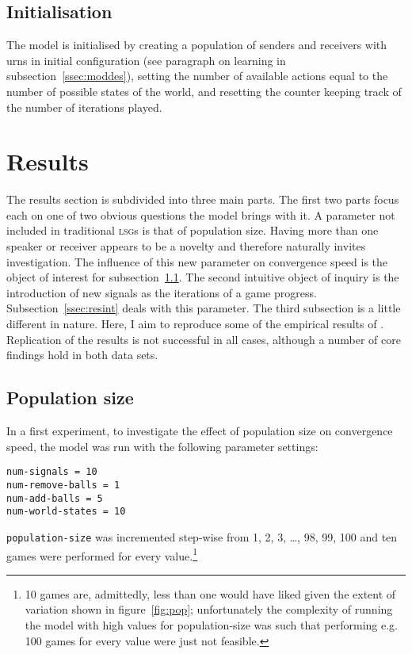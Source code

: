 \documentclass[
	DIV=calc,
	BCOR=0mm,
	pagesize,
	titlepage
]{scrartcl}
\newcommand{\code}[1]{\texttt{#1}}
\newcommand{\lsg}{\textsc{lsg}}
\begin{document}
\subsection{Initialisation}
\label{ssec:modini}
The model is initialised by creating a population of senders and receivers with urns in initial configuration (see paragraph on learning in subsection~\ref{ssec:moddes}), setting the number of available actions equal to the number of possible states of the world, and resetting the counter keeping track of the number of iterations played.

\section{Results}
\label{sec:res}
The results section is subdivided into three main parts.
The first two parts focus each on one of two obvious questions the model brings with it.
A parameter not included in traditional \lsg s is that of population size.
Having more than one speaker or receiver appears to be a novelty and therefore naturally invites investigation.
The influence of this new parameter on convergence speed is the object of interest for subsection~\ref{ssec:respop}.
The second intuitive object of inquiry is the introduction of new signals as the iterations of a game progress.
Subsection~\ref{ssec:resint} deals with this parameter.
The third subsection is a little different in nature.
Here, I aim to reproduce some of the empirical results of \citet{barrett_numerical_2006}.
Replication of the results is not successful in all cases, although a number of core findings hold in both data sets.

\subsection{Population size}
\label{ssec:respop}
In a first experiment, to investigate the effect of population size on convergence speed, the model was run with the following parameter settings:
\begin{verbatim}
num-signals = 10
num-remove-balls = 1
num-add-balls = 5
num-world-states = 10
\end{verbatim}
\code{population-size} was incremented step-wise from 1, 2, 3, \ldots, 98, 99, 100 and ten games were performed for every value.\footnote{10 games are, admittedly, less than one would have liked given the extent of variation shown in figure~\ref{fig:pop}; unfortunately the complexity of running the model with high values for population-size was such that performing e.g. 100 games for every value were just not feasible.}
\end{document}
